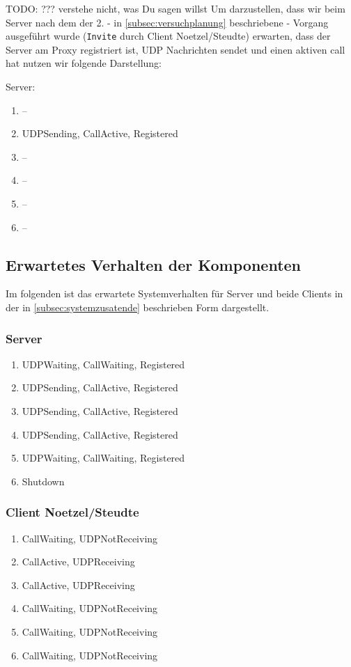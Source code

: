 \documentclass[10pt]{scrartcl}
\begin{document}
TODO: ??? verstehe nicht, was Du sagen willst
Um darzustellen, dass wir beim Server nach dem der 2. - in \ref{subsec:versuchplanung} beschriebene - Vorgang ausgeführt wurde (\verb!Invite! durch Client Noetzel/Steudte) erwarten, dass der Server am Proxy registriert ist, UDP Nachrichten sendet und einen aktiven call hat nutzen wir folgende Darstellung:

Server:
\begin{enumerate}
	\item --
	\item UDPSending, CallActive, Registered
	\item --
	\item --
	\item --
	\item --
\end{enumerate}

\subsection{Erwartetes Verhalten der Komponenten}\label{subsec:erwartetesSystemverhalten}
Im folgenden ist das erwartete Systemverhalten für Server und beide Clients in der in \ref{subsec:systemzusatende} beschrieben Form dargestellt.

\subsubsection{Server}
\begin{enumerate}
	\item UDPWaiting, CallWaiting, Registered
	\item UDPSending, CallActive, Registered
	\item UDPSending, CallActive, Registered
	\item UDPSending, CallActive, Registered
	\item UDPWaiting, CallWaiting, Registered
	\item Shutdown
\end{enumerate}

\subsubsection{Client Noetzel/Steudte}
\begin{enumerate}
	\item CallWaiting, UDPNotReceiving
	\item CallActive, UDPReceiving
	\item CallActive, UDPReceiving
	\item CallWaiting, UDPNotReceiving
	\item CallWaiting, UDPNotReceiving
	\item CallWaiting, UDPNotReceiving
\end{enumerate}
\end{document}
